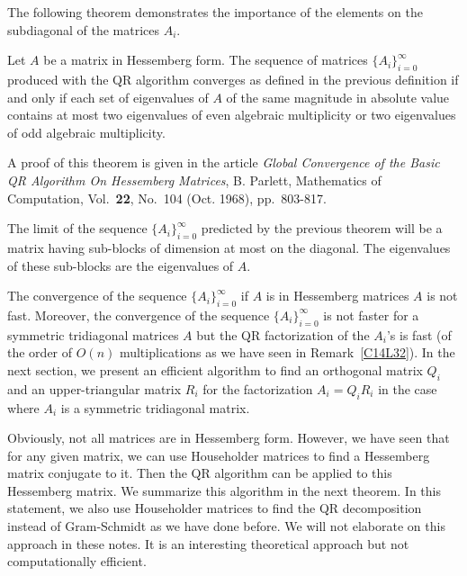 The following theorem demonstrates the importance of the elements on the
subdiagonal of the matrices $A_i$.

\begin{theorem}[Parlett]
Let $A$ be a \nn matrix in Hessemberg form.  The sequence of matrices
$\displaystyle \{ A_i\}_{i=0}^\infty$ produced with the QR algorithm
converges as defined in the previous definition if and only if each
set of eigenvalues of $A$ of the same magnitude in absolute value
contains at most two eigenvalues of even algebraic multiplicity or two
eigenvalues of odd algebraic multiplicity.
\end{theorem}

A proof of this theorem is given in the article {\it Global Convergence of
the Basic QR Algorithm On Hessemberg Matrices}, B. Parlett, Mathematics of
Computation, Vol.\ {\bfseries 22}, No.\ 104 (Oct. 1968), pp.\ 803-817.

The limit of the sequence $\displaystyle \{ A_i\}_{i=0}^\infty$ predicted by
the previous theorem will be a matrix having sub-blocks of dimension at most
 on the diagonal.  The eigenvalues of these sub-blocks are the
eigenvalues of $A$.

The convergence of the sequence $\displaystyle \{ A_i\}_{i=0}^\infty$ if $A$
is in Hessemberg matrices $A$ is not fast.  Moreover, the convergence of the
sequence $\displaystyle \{ A_i\}_{i=0}^\infty$ is not faster for a symmetric
tridiagonal matrices $A$ but the QR factorization of the $A_i$'s is fast (of
the order of $O(n)$ multiplications as we have seen in
Remark~\ref{C14L32}).  In the next section, we present an efficient
algorithm to find an orthogonal matrix $Q_i$ and an upper-triangular matrix
$R_i$ for the factorization $A_i = Q_i R_i$ in the case where $A_i$ is a
symmetric tridiagonal matrix.

Obviously, not all matrices are in Hessemberg form.  However, we have
seen that for any given matrix, we can use Householder matrices to
find a Hessemberg matrix conjugate to it.  Then the QR algorithm can
be applied to this Hessemberg matrix.  We summarize this algorithm in
the next theorem.  In this statement, we also use Householder matrices
to find the QR decomposition instead of Gram-Schmidt as we have done
before.  We will not elaborate on this approach in these notes.  It is
an interesting theoretical approach but not computationally efficient.

